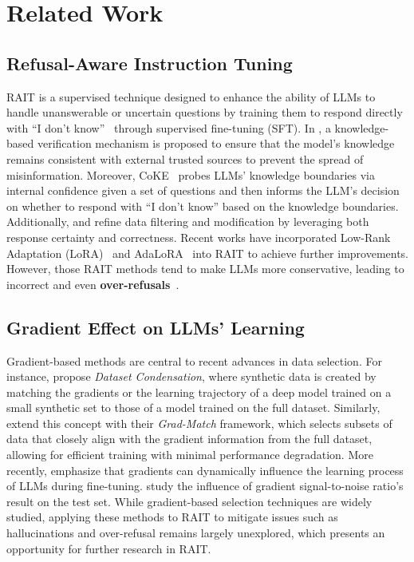 \section{Related Work}
\label{sec:Related Work}
\subsection{Refusal-Aware Instruction Tuning}
RAIT is a supervised technique designed to enhance the ability of LLMs to handle unanswerable or uncertain questions by training them to respond directly with ``I don't know''~\cite{R_Tuning,alignment_for_honesty,zhu2024utilizeflowsteppingriver} through supervised fine-tuning (SFT). 
In \citet{wan2024mitigating}, a knowledge-based verification mechanism is proposed to ensure that the model's knowledge remains consistent with external trusted sources to prevent the spread of misinformation.
Moreover, CoKE~\cite{cokeee} probes LLMs' knowledge boundaries via internal confidence given a set of questions and then informs the LLM's decision on whether to respond with ``I don't know'' based on the knowledge boundaries. Additionally, \citep{zhu2024utilizeflowsteppingriver} and \citep{ula} refine data filtering and modification by leveraging both response certainty and correctness.
Recent works have incorporated Low-Rank Adaptation (LoRA)~\cite{hulora} and AdaLoRA~\cite{Wolfe_2024} into RAIT to achieve further improvements. However, those RAIT methods tend to make LLMs more conservative, leading to incorrect and even \textbf{over-refusals}~\cite{cheng2024can}.

\subsection{Gradient Effect on LLMs' Learning}
Gradient-based methods are central to recent advances in data selection. For instance, \citep{zhao2021dataset,Xia_Malladi_Gururangan_Arora_Chen,yang2024smalltolarges2lscalabledata} propose \textit{Dataset Condensation}, where synthetic data is created by matching the gradients or the learning trajectory of a deep model trained on a small synthetic set to those of a model trained on the full dataset. Similarly, \citep{killamsetty2021gradmatch,killamsetty2021subset} extend this concept with their \textit{Grad-Match} framework, which selects subsets of data that closely align with the gradient information from the full dataset, allowing for efficient training with minimal performance degradation.
More recently, \citep{ren2024learningdynamics,zhao2020dataset,qiao2024PGP,Bai_Zhang_Tao_Wu_Wang_Xu_2023} emphasize that gradients can dynamically influence the learning process of LLMs during fine-tuning. 
\citep{Liu_Jiang_Bai_Chen_Wang_2020,Xiao2024CertifiedRobustness} study the influence of gradient signal-to-noise ratio's result on the test set.
While gradient-based selection techniques are widely studied, applying these methods to RAIT to mitigate issues such as hallucinations and over-refusal remains largely unexplored, which presents an opportunity for further research in RAIT.